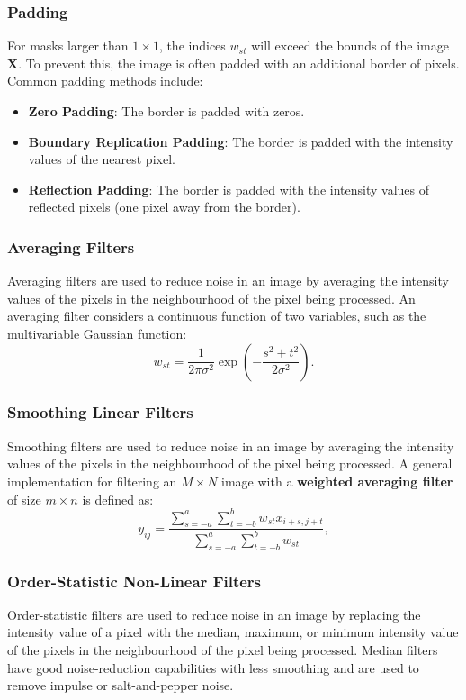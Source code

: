 \documentclass{article}
\begin{document}
\subsubsection{Padding}
For masks larger than \(1 \times 1\), the indices \(w_{st}\) will
exceed the bounds of the image \(\symbf{X}\). To prevent this, the
image is often padded with an additional border of pixels. Common
padding methods include:
\begin{itemize}
    \item \textbf{Zero Padding}: The border is padded with zeros.
    \item \textbf{Boundary Replication Padding}: The border is padded with the
          intensity values of the nearest pixel.
    \item \textbf{Reflection Padding}: The border is padded with the
          intensity values of reflected pixels (one pixel away from the
          border).
\end{itemize}
\subsubsection{Averaging Filters}
Averaging filters are used to reduce noise in an image by averaging the
intensity values of the pixels in the neighbourhood of the pixel being
processed. An averaging filter considers a continuous function of two
variables, such as the multivariable Gaussian function:
\begin{equation*}
    w_{st} = \frac{1}{2\pi\sigma^2} \exp{\left( -\frac{s^2 + t^2}{2\sigma^2} \right)}.
\end{equation*}
\subsubsection{Smoothing Linear Filters}
Smoothing filters are used to reduce noise in an image by averaging the
intensity values of the pixels in the neighbourhood of the pixel being
processed. A general implementation for filtering an \(M \times N\)
image with a \textbf{weighted averaging filter} of size \(m \times n\)
is defined as:
\begin{equation*}
    y_{ij} = \frac{\sum_{s = -a}^a \sum_{t = -b}^b w_{st} x_{i+s,j+t}}{\sum_{s = -a}^a \sum_{t = -b}^b w_{st}},
\end{equation*}
\subsubsection{Order-Statistic Non-Linear Filters}
Order-statistic filters are used to reduce noise in an image by
replacing the intensity value of a pixel with the median, maximum, or
minimum intensity value of the pixels in the neighbourhood of the pixel
being processed. Median filters have good noise-reduction capabilities
with less smoothing and are used to remove impulse or salt-and-pepper
noise.
\end{document}
